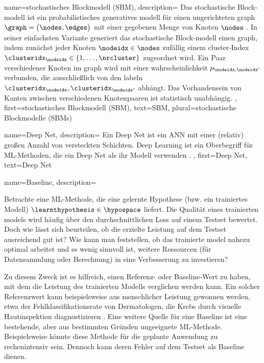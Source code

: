{{{
{
	name={stochastisches Blockmodell (SBM)},
	description={
		Das stochastische Block-\gls{modell} ist ein probabilistisches generatives \gls{modell} für einen ungerichteten \gls{graph} $\graph = \big( \nodes, \edges \big)$ 
		mit einer gegebenen Menge von Knoten $\nodes$ \cite{AbbeSBM2018}. In seiner einfachsten Variante 
		generiert das stochastische Block-\gls{modell} einen \gls{graph}, indem zunächst jeder Knoten $\nodeidx \in \nodes$ 
		zufällig einem \gls{cluster}-Index $\clusteridx_{\nodeidx} \in \{1,\ldots,\nrcluster\}$ zugeordnet wird. 
		Ein Paar verschiedener Knoten im \gls{graph} wird mit einer \gls{wahrscheinlichkeit} $p_{\nodeidx,\nodeidx'}$ verbunden, 
		die ausschließlich von den \gls{label}n $\clusteridx_{\nodeidx}, \clusteridx_{\nodeidx'}$ abhängt. 
		Das Vorhandensein von Kanten zwischen verschiedenen Knotenpaaren ist statistisch unabhängig.
	},
	first={stochastisches Blockmodell (SBM)},
	text={SBM}, 
	plural={stochastische Blockmodelle (SBMs)}
}

{
	name={Deep Net},
	description={
		Ein Deep Net ist ein \gls{ANN} mit einer (relativ) großen Anzahl von 
		versteckten Schichten. Deep Learning ist ein Oberbegriff für \gls{ML}-Methoden, die ein Deep
		 Net als ihr \gls{Modell} verwenden \cite{Goodfellow-et-al-2016}.
	},
	first={Deep Net},
	text={Deep Net}
}


{
	name={Baseline},
	description={
		Betrachte eine \gls{ML}-Methode, die eine gelernte \gls{Hypothese} (bzw. ein trainiertes \gls{Modell}) $\learnthypothesis \in \hypospace$ liefert.
		 Die Qualität eines trainierten \gls{model}s wird häufig über den durchschnittlichen \gls{Loss} auf einem \gls{Testset} bewertet. Doch wie lässt 
		 sich beurteilen, ob die erzielte Leistung auf dem \gls{Testset} ausreichend gut ist? Wie kann man feststellen, ob das trainierte 
		 \gls{model} nahezu optimal arbeitet und es wenig sinnvoll ist, weitere Ressourcen (für \gls{Daten}sammlung oder Berechnung) in eine Verbesserung zu investieren? 
		
		Zu diesem Zweck ist es hilfreich, einen Referenz- oder Baseline-Wert zu haben, mit dem die Leistung des trainierten \gls{Modells} 
		verglichen werden kann. Ein solcher Referenzwert kann beispielsweise aus menschlicher Leistung gewonnen werden, etwa der Fehlklassifikationsrate 
		von Dermatologen, die Krebs durch visuelle Hautinspektion diagnostizieren \cite{SkinHumanAI}. Eine weitere Quelle für eine Baseline ist eine bestehende, 
		aber aus bestimmten Gründen ungeeignete \gls{ML}-Methode. Beispielsweise könnte diese Methode für die geplante Anwendung zu rechenintensiv sein. Dennoch 
		kann deren Fehler auf dem \gls{Testset} als Baseline dienen.
		
}}}}}

